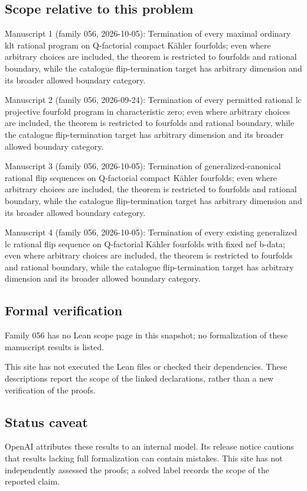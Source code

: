 \documentclass[11pt]{article}
\begin{document}
\subsection{Scope relative to this problem}
Manuscript 1 (family 056, 2026-10-05): Termination of every maximal ordinary klt rational program on Q-factorial compact Kähler fourfolds; even where arbitrary choices are included, the theorem is restricted to fourfolds and rational boundary, while the catalogue flip-termination target has arbitrary dimension and its broader allowed boundary category.

Manuscript 2 (family 056, 2026-09-24): Termination of every permitted rational lc projective fourfold program in characteristic zero; even where arbitrary choices are included, the theorem is restricted to fourfolds and rational boundary, while the catalogue flip-termination target has arbitrary dimension and its broader allowed boundary category.

Manuscript 3 (family 056, 2026-10-05): Termination of generalized-canonical rational flip sequences on Q-factorial compact Kähler fourfolds; even where arbitrary choices are included, the theorem is restricted to fourfolds and rational boundary, while the catalogue flip-termination target has arbitrary dimension and its broader allowed boundary category.

Manuscript 4 (family 056, 2026-10-05): Termination of every existing generalized lc rational flip sequence on Q-factorial Kähler fourfolds with fixed nef b-data; even where arbitrary choices are included, the theorem is restricted to fourfolds and rational boundary, while the catalogue flip-termination target has arbitrary dimension and its broader allowed boundary category.

\subsection{Formal verification}
Family 056 has no Lean scope page in this snapshot; no formalization of these manuscript results is listed.

This site has not executed the Lean files or checked their dependencies. These descriptions report the scope of the linked declarations, rather than a new verification of the proofs.

\subsection{Status caveat}
OpenAI attributes these results to an internal model. Its release notice cautions that results lacking full formalization can contain mistakes. This site has not independently assessed the proofs; a solved label records the scope of the reported claim.
\end{document}
